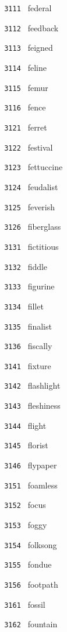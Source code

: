 \documentclass[11pt]{article}
\begin{document}
\begin{multicols}{6}
\small
\noindent \texttt{ 3111 } federal  \par
\noindent \texttt{ 3112 } feedback  \par
\noindent \texttt{ 3113 } feigned  \par
\noindent \texttt{ 3114 } feline  \par
\noindent \texttt{ 3115 } femur  \par
\noindent \texttt{ 3116 } fence  \par
\noindent \texttt{ 3121 } ferret  \par
\noindent \texttt{ 3122 } festival  \par
\noindent \texttt{ 3123 } fettuccine  \par
\noindent \texttt{ 3124 } feudalist  \par
\noindent \texttt{ 3125 } feverish  \par
\noindent \texttt{ 3126 } fiberglass  \par
\noindent \texttt{ 3131 } fictitious  \par
\noindent \texttt{ 3132 } fiddle  \par
\noindent \texttt{ 3133 } figurine  \par
\noindent \texttt{ 3134 } fillet  \par
\noindent \texttt{ 3135 } finalist  \par
\noindent \texttt{ 3136 } fiscally  \par
\noindent \texttt{ 3141 } fixture  \par
\noindent \texttt{ 3142 } flashlight  \par
\noindent \texttt{ 3143 } fleshiness  \par
\noindent \texttt{ 3144 } flight  \par
\noindent \texttt{ 3145 } florist  \par
\noindent \texttt{ 3146 } flypaper  \par
\noindent \texttt{ 3151 } foamless  \par
\noindent \texttt{ 3152 } focus  \par
\noindent \texttt{ 3153 } foggy  \par
\noindent \texttt{ 3154 } folksong  \par
\noindent \texttt{ 3155 } fondue  \par
\noindent \texttt{ 3156 } footpath  \par
\noindent \texttt{ 3161 } fossil  \par
\noindent \texttt{ 3162 } fountain  \par

\end{multicols}
\end{document}
